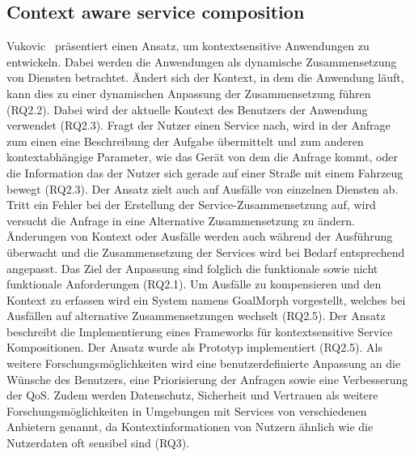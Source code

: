 \documentclass[conference,compsoc,ngerman]{IEEEtran}
\begin{document}
\subsection{Context aware service composition}
Vukovic~\cite{vukovic2007context} präsentiert einen Ansatz, um kontextsensitive Anwendungen zu entwickeln. Dabei werden die Anwendungen als dynamische Zusammensetzung von Diensten betrachtet. Ändert sich der Kontext, in dem die Anwendung läuft, kann dies zu einer dynamischen Anpassung der Zusammensetzung führen (RQ2.2). Dabei wird der aktuelle Kontext des Benutzers der Anwendung verwendet (RQ2.3). Fragt der Nutzer einen Service nach, wird in der Anfrage zum einen eine Beschreibung der Aufgabe übermittelt und zum anderen kontextabhängige Parameter, wie das Gerät von dem die Anfrage kommt, oder die Information das der Nutzer sich gerade auf einer Straße mit einem Fahrzeug bewegt (RQ2.3).
Der Ansatz zielt auch auf Ausfälle von einzelnen Diensten ab. Tritt ein Fehler bei der Erstellung der Service-Zusammensetzung auf, wird versucht die Anfrage in eine Alternative Zusammensetzung zu ändern.
Änderungen von Kontext oder Ausfälle werden auch während der Ausführung überwacht und die Zusammensetzung der Services wird bei Bedarf entsprechend angepasst.
Das Ziel der Anpassung sind folglich die funktionale sowie nicht funktionale Anforderungen (RQ2.1).
Um Ausfälle zu kompensieren und den Kontext zu erfassen wird ein System namens GoalMorph vorgestellt, welches bei Ausfällen auf alternative Zusammensetzungen wechselt (RQ2.5). Der Ansatz beschreibt die Implementierung eines Frameworks für kontextsensitive Service Kompositionen. Der Ansatz wurde als Prototyp implementiert (RQ2.5).
Als weitere Forschungsmöglichkeiten wird eine benutzerdefinierte Anpassung an die Wünsche des Benutzers, eine Priorisierung der Anfragen sowie eine Verbesserung der QoS. Zudem werden Datenschutz, Sicherheit und Vertrauen als weitere Forschungsmöglichkeiten in Umgebungen mit Services von verschiedenen Anbietern genannt, da Kontextinformationen von Nutzern ähnlich wie die Nutzerdaten oft sensibel sind (RQ3).
\end{document}
